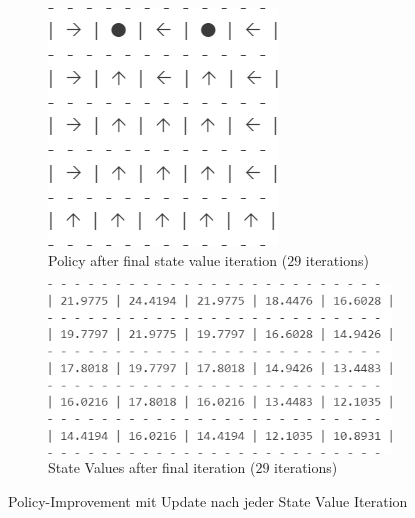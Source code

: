 \documentclass[11pt]{article}
\begin{document}
\begin{figure}
    \begin{subfigure}[t]{0.32\textwidth}
        \includegraphics[width=\textwidth]{img/3_1_b_it29_pol.png}
        \caption{Policy after final state value iteration ($29$ iterations)}
        \label{img:3_1_b_final_pol}
    \end{subfigure}
    \hfill
    \begin{subfigure}[t]{0.65\textwidth}
        \includegraphics[width=\textwidth]{img/3_1_b_it29_grid.png}
        \caption{State Values after final iteration ($29$ iterations)}
        \label{img:3_1_b_final_grd}
    \end{subfigure}
    \caption{Policy-Improvement mit Update nach jeder State Value Iteration}
    \label{img:3_1_b}
\end{figure}
\end{document}
